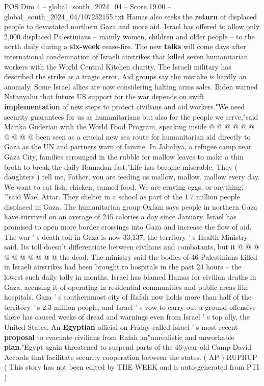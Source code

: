 \begin{textsample}{POS Dim 4 – global\_south\_2024\_04 – Score 19.00 – global\_south\_2024\_04/107252155.txt}
Hamas also seeks the \textbf{return} of displaced people to devastated northern Gaza and more aid.
Israel has offered to allow only 2,000 displaced Palestinians -- mainly women, children and older people -- to the north daily during a \textbf{six-week} cease-fire.
The new \textbf{talks} will come days after international condemnation of Israeli airstrikes that killed seven humanitarian workers with the World Central Kitchen charity.
The Israeli military has described the strike as a tragic error.
Aid groups say the mistake is hardly an anomaly.
Some Israel allies are now considering halting arms sales.
Biden warned Netanyahu that future US support for the war depends on swift \textbf{implementation} of new steps to protect civilians and aid workers."We need security guarantees for us as humanitarians but also for the people we serve,"said Marika Guderian with the World Food Program, speaking inside @ @ @ @ @ @ @ @ @ @ been seen as a crucial new sea route for humanitarian aid directly to Gaza as the UN and partners warn of famine.
In Jabaliya, a refugee camp near Gaza City, families scrounged in the rubble for mallow leaves to make a thin broth to break the daily Ramadan fast."Life has become miserable.
They ( daughters ) tell me, Father, you are feeding us mallow, mallow, mallow every day.
We want to eat fish, chicken, canned food.
We are craving eggs, or anything, '"said Wael Attar.
They shelter in a school as part of the 1.7 million people displaced in Gaza.
The humanitarian group Oxfam says people in northern Gaza have survived on an average of 245 calories a day since January.
Israel has promised to open more border crossings into Gaza and increase the flow of aid.
The war ' s death toll in Gaza is now 33,137, the territory ' s Health Ministry said.
Its toll doesn't differentiate between civilians and combatants, but it @ @ @ @ @ @ @ @ @ @ the dead.
The ministry said the bodies of 46 Palestinians killed in Israeli airstrikes had been brought to hospitals in the past 24 hours -- the lowest such daily tally in months.
Israel has blamed Hamas for civilian deaths in Gaza, accusing it of operating in residential communities and public areas like hospitals.
Gaza ' s southernmost city of Rafah now holds more than half of the territory ' s 2.3 million people, and Israel ' s vow to carry out a ground offensive there has caused weeks of dread and warnings even from Israel ' s top ally, the United States.
An \textbf{Egyptian} official on Friday called Israel ' s most recent \textbf{proposal} to evacuate civilians from Rafah an"unrealistic and unworkable \textbf{plan}."Egypt again threatened to suspend parts of the 46-year-old Camp David Accords that facilitate security cooperation between the states. ( AP ) RUPRUP ( This story has not been edited by THE WEEK and is auto-generated from PTI )

\end{textsample}
